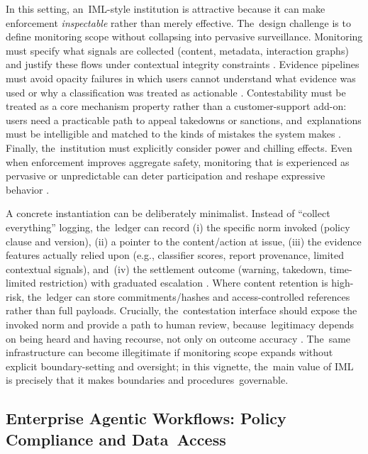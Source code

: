\documentclass[mca,article,accept,pdftex,oneauthor]{Definitions/mdpi}
\begin{document}
In this setting, an~IML-style institution is attractive because it can make enforcement \emph{inspectable} rather than merely effective. The~design challenge is to define monitoring scope without collapsing into pervasive surveillance. Monitoring must specify what signals are collected (content, metadata, interaction graphs) and justify these flows under contextual integrity constraints \citep{Nissenbaum2004}. Evidence pipelines must avoid opacity failures in which users cannot understand what evidence was used or why a classification was treated as actionable \citep{Burrell2016Opacity}. Contestability must be treated as a core mechanism property rather than a customer-support add-on: users need a practicable path to appeal takedowns or sanctions, and~explanations must be intelligible and matched to the kinds of mistakes the system makes \citep{Lee2019ProceduralJustice}. Finally, the~institution must explicitly consider power and chilling effects. Even when enforcement improves aggregate safety, monitoring that is experienced as pervasive or unpredictable can deter participation and reshape expressive behavior \citep{Lyon2007Surveillance,Foucault1977DisciplinePunish}.

A concrete instantiation can be deliberately minimalist. Instead of ``collect everything'' logging, the~ledger can record (i) the specific norm invoked (policy clause and version), (ii) a pointer to the content/action at issue, (iii) the evidence features actually relied upon (e.g., classifier scores, report provenance, limited contextual signals), and~(iv) the settlement outcome (warning, takedown, time-limited restriction) with graduated escalation \citep{Ostrom1990}. Where content retention is high-risk, the~ledger can store commitments/hashes and access-controlled references rather than full payloads. Crucially, the~contestation interface should expose the invoked norm and provide a path to human review, because~legitimacy depends on being heard and having recourse, not only on outcome accuracy \citep{Tyler1990,Lee2019ProceduralJustice}. The~same infrastructure can become illegitimate if monitoring scope expands without explicit boundary-setting and oversight; in this vignette, the~main value of IML is precisely that it makes boundaries and procedures~governable.

\subsection{Enterprise Agentic Workflows: Policy Compliance and Data~Access}
\end{document}
